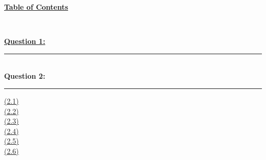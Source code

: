\documentclass[12pt]{article}
\begin{document}
\begin{center}
	\hypertarget{toc}{\LARGE \underline{\textbf{Table of Contents}}}\\
\end{center}

\hyperlink{1}{\textbf{Question 1:}}
\vspace{1mm}
\hrule
~\\

{\textbf{Question 2:}}
\vspace{1mm}
\hrule
\vspace{1mm}
\hyperlink{2.1}{(2.1)}\\
\hyperlink{2.2}{(2.2)}\\
\hyperlink{2.3}{(2.3)}\\
\hyperlink{2.4}{(2.4)}\\
\hyperlink{2.5}{(2.5)}\\
\hyperlink{2.6}{(2.6)}

\newpage
\end{document}
